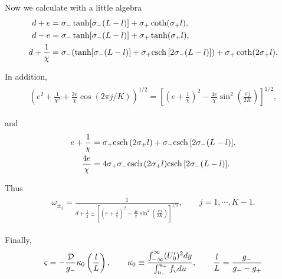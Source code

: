Now we calculate with a little algebra
% 
\begin{equation*}
	\begin{split}
	\begin{aligned}
	  d + e&= \sigma_-\tanh[\sigma_-(L-l)]+\sigma_+\coth(\sigma_+l),\\
	  d - e&= \sigma_-\tanh[\sigma_-(L-l)]+\sigma_+\tanh(\sigma_+l),\\
	  d + \frac{1}{\chi} &= \sigma_-(\tanh[\sigma_-(L-l)]+\sigma_+\mathrm{csch} \,[2\sigma_-(L-l)]) + \sigma_+\coth(2\sigma_+l).
	\end{aligned}
	\end{split}
\end{equation*}
%

In addition,
% 
\begin{equation*}
	\begin{split}
	\begin{aligned}
	  \left(e^2 + \frac{1}{\chi^2} + \frac{2e}{\chi}\cos(2\pi j/K) \right)^{1/2} = \left[\left(e + \frac{1}{\chi}\right)^2 - \frac{4e}{\chi}\sin^2\left(\frac{\pi j}{2K}\right) \right]^{1/2},
	\end{aligned}
	\end{split}
\end{equation*}
%

and
% 
\begin{equation*}
	\begin{split}
	\begin{aligned}
	  e+\frac{1}{\chi} &= \sigma_+\mathrm{csch} \,(2\sigma_+l) + \sigma_-\mathrm{csch} \,[2\sigma_-(L-l)],\\
	  \frac{4e}{\chi} &= 4\sigma_+\sigma_-\mathrm{csch} \,(2\sigma_+l)\mathrm{csch} \,[2\sigma_-(L-l)].
	\end{aligned}
	\end{split}
\end{equation*}
%

Thus
% 
\begin{equation*}
	\begin{split}
	\begin{aligned}
	  \omega_{\pm_j} = \frac{1}{d+\frac{1}{\chi}\pm \left[\left(e + \frac{1}{\chi}\right)^2 - \frac{4e}{\chi}\sin^2\left(\frac{\pi j}{2K}\right) \right]^{1/2}},\qquad j=1,\cdots,K-1.
	\end{aligned}
	\end{split}
\end{equation*}
%

Finally,
% 
\begin{equation*}
	\begin{split}
	\begin{aligned}
	  \varsigma = -\frac{\mathcal{D}}{g_-}\kappa_0\left(\frac{l}{L} \right),\qquad \kappa_0\equiv\dfrac{\int_{-\infty}^{\infty}(U_0')^2 dy}{\int_{u_-}^{u_+}f_vdu},\qquad \frac{l}{L} = \frac{g_-}{g_--g_+} 
	\end{aligned}
	\end{split}
\end{equation*}
%